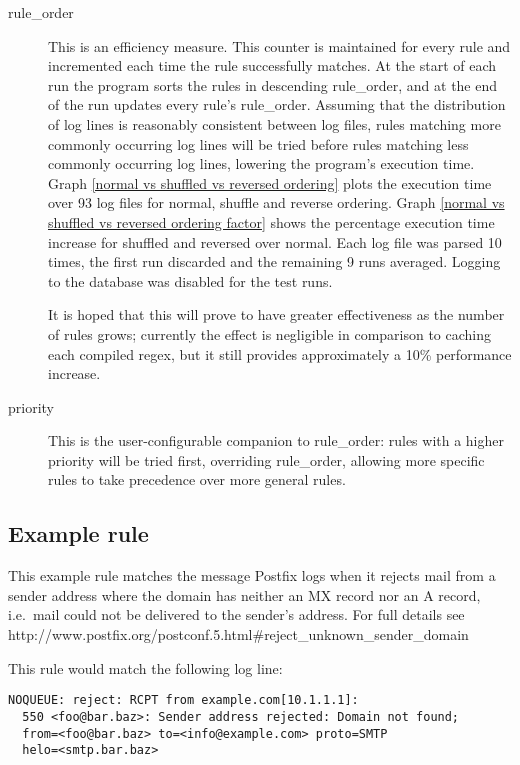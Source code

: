 \documentclass[a4paper,12pt,draft]{article}
\begin{document}
\begin{description}
    \item [rule\_order] This is an efficiency measure.  This counter is
        maintained for every rule and incremented each time the rule
        successfully matches.  At the start of each run the program sorts
        the rules in descending rule\_order, and at the end of the run
        updates every rule's rule\_order.  Assuming that the distribution
        of log lines is reasonably consistent between log files, rules
        matching more commonly occurring log lines will be tried before
        rules matching less commonly occurring log lines, lowering the
        program's execution time.  Graph \ref{normal vs shuffled vs
        reversed ordering} plots the execution time over 93 log files for
        normal, shuffle and reverse ordering.  Graph \ref{normal vs
        shuffled vs reversed ordering factor} shows the percentage
        execution time increase for shuffled and reversed over normal.
        Each log file was parsed 10 times, the first run discarded and the
        remaining 9 runs averaged.  Logging to the database was disabled
        for the test runs.

        It is hoped that this will prove to have greater effectiveness as
        the number of rules grows; currently the effect is negligible
        in comparison to caching each compiled regex, but it still provides
        approximately a 10\% performance increase.

    \item [priority] This is the user-configurable companion to
        rule\_order: rules with a higher priority will be tried first,
        overriding rule\_order, allowing more specific rules to take
        precedence over more general rules.

\end{description}


\subsection{Example rule}

This example rule matches the message Postfix logs when it rejects mail
from a sender address where the domain has neither an MX record nor an A
record, i.e.\ mail could not be delivered to the sender's address.  For full
details see
http://www.postfix.org/postconf.5.html\#reject\_unknown\_sender\_domain

This rule would match the following log line:

\begin{verbatim}
NOQUEUE: reject: RCPT from example.com[10.1.1.1]: 
  550 <foo@bar.baz>: Sender address rejected: Domain not found;
  from=<foo@bar.baz> to=<info@example.com> proto=SMTP
  helo=<smtp.bar.baz>
\end{verbatim}
\end{document}

